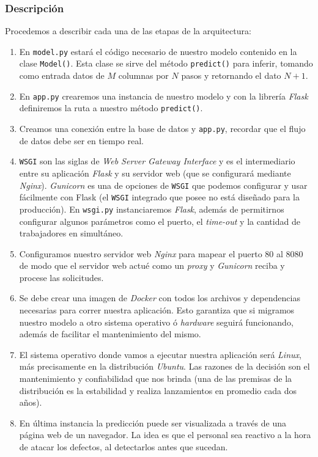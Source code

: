 \documentclass[a4paper,12pt]{article}
\begin{document}
		\subsubsection{Descripción}
		Procedemos a describir cada una de las etapas de la arquitectura:
		\begin{enumerate}[noitemsep, topsep=2pt]
			\item En \texttt{model.py} estará el código necesario de nuestro modelo contenido en la clase \texttt{Model()}. Esta clase se sirve del método \texttt{predict()} para inferir, tomando como entrada datos de $M$ columnas por $N$ pasos y retornando el dato $N+1$.
			\item En \texttt{app.py} crearemos una instancia de nuestro modelo y con la librería \textit{Flask} definiremos la ruta a nuestro método \texttt{predict()}.
			\item Creamos una conexión entre la base de datos y \texttt{app.py}, recordar que el flujo de datos debe ser en tiempo real.
			\item \texttt{WSGI} son las siglas de \textit{Web Server Gateway Interface} y es el intermediario entre su aplicación \textit{Flask} y su servidor web (que se configurará mediante \textit{Nginx}). \textit{Gunicorn} es una de opciones de \texttt{WSGI} que podemos configurar y usar fácilmente con Flask (el \texttt{WSGI} integrado que posee no está diseñado para la producción). En \texttt{wsgi.py} instanciaremos \textit{Flask}, además de permitirnos configurar algunos parámetros como el puerto, el \textit{time-out} y la cantidad de trabajadores en simultáneo.
			\item Configuramos nuestro servidor web \textit{Nginx} para mapear el puerto 80 al 8080 de modo que el servidor web actué como un \textit{proxy} y \textit{Gunicorn} reciba y procese las solicitudes.
			\item Se debe crear una imagen de \textit{Docker} con todos los archivos y dependencias necesarias para correr nuestra aplicación. Esto garantiza que si migramos nuestro modelo a otro sistema operativo ó \textit{hardware} seguirá funcionando, además de facilitar el mantenimiento del mismo.
			\item El sistema operativo donde vamos a ejecutar nuestra aplicación será \textit{Linux}, más precisamente en la distribución \textit{Ubuntu}. Las razones de la decisión son el mantenimiento y confiabilidad que nos brinda (una de las premisas de la distribución es la estabilidad y realiza lanzamientos en promedio cada dos años).
			\item En última instancia la predicción puede ser visualizada a través de una página web de un navegador. La idea es que el personal sea reactivo a la hora de atacar los defectos, al detectarlos antes que sucedan.
		\end{enumerate}
		
\end{document}
